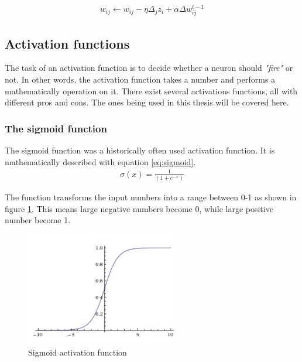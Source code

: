\documentclass[USenglish]{ifimaster}  %
\begin{document}
\begin{equation}\label{eq:momentum}
\begin{aligned}
w_{ij} \longleftarrow w_{ij} - \eta\Delta_j z_i+\alpha\Delta w^{t-1}_{ij}
\end{aligned}
\end{equation}

\subsection{Activation functions}
The task of an activation function is to decide whether a neuron should \textit{"fire"} or not. In other words, the activation function takes a number and performs a mathematically operation on it. There exist several activations functions, all with different pros and cons. The ones being used in this thesis will be covered here.
\subsubsection{The sigmoid function}
The sigmoid function was a historically often used activation function. It is mathematically described with equation \cref{eq:sigmoid}.
\begin{equation}\label{eq:sigmoid}
\begin{aligned}
\sigma(x) = \frac{1}{(1 + e^{-x})}
\end{aligned}
\end{equation}

The function transforms the input numbers into a range between 0-1 as shown in figure \cref{fig:sigmoid}. This means large negative numbers become 0, while large positive number become 1.

\begin{figure}[ht]
    \centering
    \includegraphics[width=0.6\textwidth]{bilder/sigmoid_function.png}
    \caption{Sigmoid activation function \cite{website:cs231n_activation_functions}}
    \label{fig:sigmoid}
\end{figure}
\end{document}
